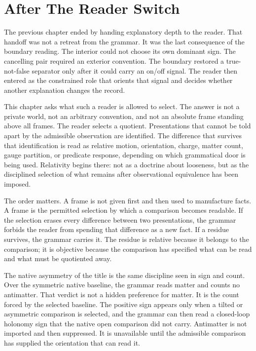 \section{After The Reader Switch}

The previous chapter ended by handing explanatory depth to the reader. That
handoff was not a retreat from the grammar. It was the last consequence of
the boundary reading. The interior could not choose its own dominant sign.
The cancelling pair required an exterior convention. The boundary restored a
true-not-false separator only after it could carry an on/off signal. The
reader then entered as the constrained role that orients that signal and
decides whether another explanation changes the record.

This chapter asks what such a reader is allowed to select. The answer is not
a private world, not an arbitrary convention, and not an absolute frame
standing above all frames. The reader selects a quotient. Presentations that
cannot be told apart by the admissible observation are identified. The
difference that survives that identification is read as relative motion,
orientation, charge, matter count, gauge partition, or predicate response,
depending on which grammatical door is being used. Relativity begins there:
not as a doctrine about looseness, but as the disciplined selection of what
remains after observational equivalence has been imposed.

The order matters. A frame is not given first and then used to manufacture
facts. A frame is the permitted selection by which a comparison becomes
readable. If the selection erases every difference between two
presentations, the grammar forbids the reader from spending that difference
as a new fact. If a residue survives, the grammar carries it. The residue is
relative because it belongs to the comparison; it is objective because the
comparison has specified what can be read and what must be quotiented away.

The native asymmetry of the title is the same discipline seen in sign and
count. Over the symmetric native baseline, the grammar reads matter and
counts no antimatter. That verdict is not a hidden preference for matter. It
is the count forced by the selected baseline. The positive sign appears only
when a tilted or asymmetric comparison is selected, and the grammar can then
read a closed-loop holonomy sign that the native open comparison did not
carry. Antimatter is not imported and then suppressed. It is unavailable
until the admissible comparison has supplied the orientation that can read
it.

